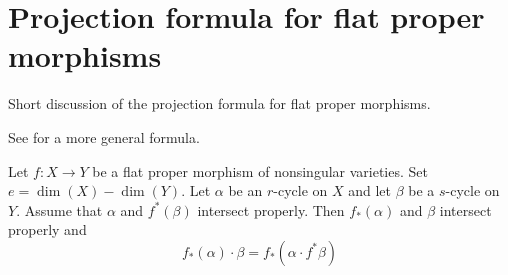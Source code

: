 \section{Projection formula for flat proper morphisms}
\label{section-projection-formula-flat}

\noindent
Short discussion of the projection formula for flat proper morphisms.

\begin{lemma}
\label{lemma-projection-formula-flat}
\begin{reference}
See \cite[Chapter V, C), Section 7, formula (10)]{Serre_algebre_locale}
for a more general formula.
\end{reference}
Let $f : X \to Y$ be a flat proper morphism of nonsingular varieties.
Set $e = \dim(X) - \dim(Y)$. Let $\alpha$ be an $r$-cycle on $X$ and let
$\beta$ be a $s$-cycle on $Y$. Assume that $\alpha$ and $f^*(\beta)$ intersect
properly. Then $f_*(\alpha)$ and $\beta$ intersect properly and
$$
f_*(\alpha) \cdot \beta = f_*( \alpha \cdot f^*\beta)
$$
\end{lemma}

